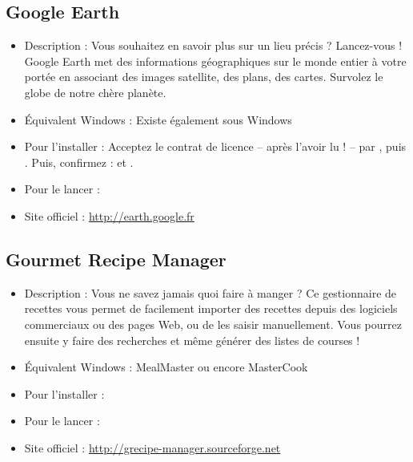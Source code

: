 \subsection{Google Earth}
\begin{itemize}
\begingroup
{}
\item Description : Vous souhaitez en savoir plus sur un lieu précis ? Lancez-vous ! Google Earth met des informations géographiques sur le monde entier à votre portée en associant des images satellite, des plans, des cartes. Survolez le globe de notre chère planète.{\par}
\endgroup
\item Équivalent Windows : Existe également sous Windows{\par}
\item Pour l'installer :  Acceptez le contrat de licence -- après l'avoir lu ! -- par , puis . Puis, confirmez : \Touche{$\leftarrow$} et .{\par}
\item Pour le lancer : 
\item Site officiel : \url{http://earth.google.fr}{\par}
\end{itemize}
\newpage
\subsection{Gourmet Recipe Manager}
\begin{itemize}
\begingroup
{}
\item Description : Vous ne savez jamais quoi faire à manger ? Ce gestionnaire de recettes vous permet de facilement importer des recettes depuis des logiciels commerciaux ou des pages Web, ou de les saisir manuellement. Vous pourrez ensuite y faire des recherches et même générer des listes de courses !{\par}
\endgroup
\item Équivalent Windows : MealMaster ou encore MasterCook{\par}
\item Pour l'installer : 
\item Pour le lancer : 
\item Site officiel : \url{http://grecipe-manager.sourceforge.net}{\par}
\end{itemize}
